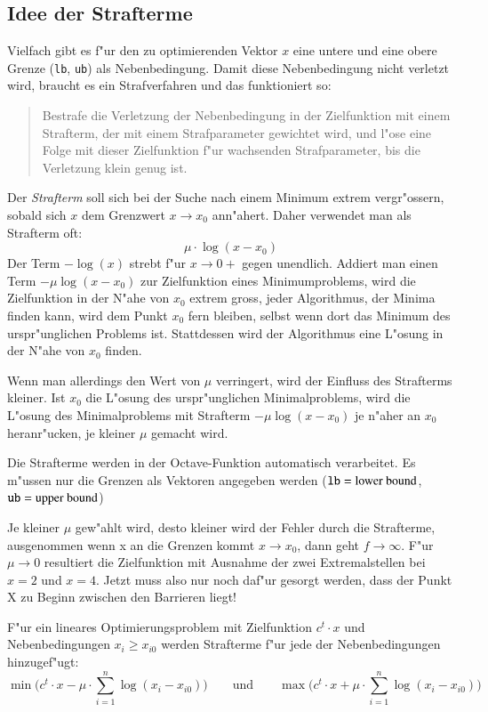 \begin{refsection}
	
\section{Idee der Strafterme}
Vielfach gibt es f"ur den zu optimierenden Vektor $x$ eine untere und
eine obere Grenze ({\tt lb}, {\tt ub}) als Nebenbedingung.
Damit diese Nebenbedingung nicht
verletzt wird, braucht es ein Strafverfahren und das funktioniert so:
\begin{quotation}
\parindent 0pt
Bestrafe die Verletzung der Nebenbedingung in der Zielfunktion mit einem
Strafterm, der mit
einem Strafparameter gewichtet wird, und l"ose eine Folge mit dieser
Zielfunktion
f"ur wachsenden Strafparameter, bis die Verletzung klein genug ist.
\end{quotation}
Der {\it Strafterm} soll sich bei der Suche nach einem Minimum extrem
vergr"ossern, sobald sich $x$ dem Grenzwert $x \to x_0$ ann"ahert.
Daher verwendet man als Strafterm oft:
\[
\mu \cdot \log(x-x_0)
\]
Der Term
$-\log(x)$ strebt f"ur $x\to 0+$ gegen unendlich.
Addiert man einen Term $-\mu\log(x-x_0)$
zur Zielfunktion eines Minimumproblems,
wird die Zielfunktion in der N"ahe von $x_0$ extrem gross,
jeder Algorithmus, der Minima finden kann, wird dem Punkt $x_0$
fern bleiben, selbst wenn dort das Minimum des urspr"unglichen
Problems ist. Stattdessen wird der Algorithmus eine L"osung in
der N"ahe von $x_0$ finden.

Wenn man allerdings den Wert von $\mu$ verringert, wird der
Einfluss des Strafterms kleiner. Ist $x_0$ die L"osung des
urspr"unglichen Minimalproblems, wird die L"osung des Minimalproblems
mit Strafterm $-\mu\log(x-x_0)$ je n"aher an $x_0$ heranr"ucken,
je kleiner $\mu$ gemacht wird.

Die Strafterme
werden in der Octave-Funktion automatisch verarbeitet. Es m"ussen nur die
Grenzen als Vektoren angegeben werden (${\tt lb}= \text{lower bound}$,
${\tt ub} = \text{upper bound}$)

Je kleiner $\mu$ gew"ahlt wird, desto kleiner wird der Fehler durch die
Strafterme, ausgenommen wenn x an die Grenzen kommt $x \to x_0$, dann
geht $f \to \infty$. F"ur $\mu \to 0$ resultiert die Zielfunktion
mit Ausnahme der zwei Extremalstellen bei $x=2$ und $x=4$. Jetzt muss
also nur noch daf"ur gesorgt werden, dass der Punkt X zu Beginn zwischen
den Barrieren liegt!

F"ur ein lineares Optimierungsproblem mit Zielfunktion $c^t\cdot x$ 
und Nebenbedingungen $x_i\ge x_{i0}$ werden Strafterme f"ur jede
der Nebenbedingungen hinzugef"ugt:
\[
 \operatorname{min}\biggl(c^t \cdot x - \mu \cdot \sum_{i=1}^n{\log(x_i -
x_{i0})}\biggr)\qquad
\text{und}\qquad    \operatorname{max}\biggl(c^t \cdot x + \mu \cdot \sum_{i=1}^n{\log(x_i
- x_{i0})}\biggr)
\]


\end{refsection}
